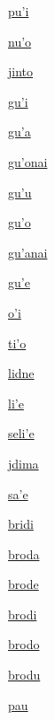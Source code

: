 {\hyperlink{val:puhi}{pu'i}}{}{}{}

{\hyperlink{val:nuho}{nu'o}}{}{}{}

{\hyperlink{val:jinto}{jinto}}{}{}{}

{\hyperlink{val:guhi}{gu'i}}{}{}{}

{\hyperlink{val:guha}{gu'a}}{}{}{}

{\hyperlink{val:guhonai}{gu'onai}}{}{}{}

{\hyperlink{val:guhu}{gu'u}}{}{}{}

{\hyperlink{val:guho}{gu'o}}{}{}{}

{\hyperlink{val:guhanai}{gu'anai}}{}{}{}

{\hyperlink{val:guhe}{gu'e}}{}{}{}

{\hyperlink{val:ohi}{o'i}}{}{}{}

{\hyperlink{val:tiho}{ti'o}}{}{}{}

{\hyperlink{val:lidne}{lidne}}{}{}{}

{\hyperlink{val:lihe}{li'e}}{}{}{}

{\hyperlink{val:selihe}{seli'e}}{}{}{}

{\hyperlink{val:jdima}{jdima}}{}{}{}

{\hyperlink{val:sahe}{sa'e}}{}{}{}

{\hyperlink{val:bridi}{bridi}}{}{}{}

{\hyperlink{val:broda}{broda}}{}{}{}

{\hyperlink{val:brode}{brode}}{}{}{}

{\hyperlink{val:brodi}{brodi}}{}{}{}

{\hyperlink{val:brodo}{brodo}}{}{}{}

{\hyperlink{val:brodu}{brodu}}{}{}{}

{\hyperlink{val:pau}{pau}}{}{}{}

